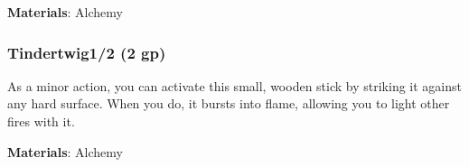 \vspace{0.25em}
\textbf{Materials}: Alchemy


\lowercase{\hypertarget{item:Tindertwig}{}}\label{item:Tindertwig}
\hypertarget{item:Tindertwig}{\subsubsection{Tindertwig\hfill1/2 (2 gp)}}

As a minor action, you can activate this small, wooden stick by striking it against any hard surface.
When you do, it bursts into flame, allowing you to light other fires with it.



\vspace{0.25em}
\textbf{Materials}: Alchemy
